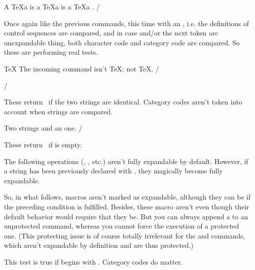 \Example
\def\tex{\TeX\iffcatnext a{ }}
A \tex is a \tex is a \tex.
\Example/

Once again like the previous commands, this time with
an \com\ifx, i.e. the definitions of control sequences
are compared, and in case  and/or the next
token are unexpandable thing, both character code and
category code are compared. So these are performing 
real \com\ifx tests.

\Example
\def\foo{not \string\TeX}
\reverse\iffxnextnospace\TeX
  {The incoming command isn't \string\TeX: } \foo.
\Example/

\description/







These return \true\ if the two strings are identical.
Category codes aren't taken into account when strings
are compared.

\Example
Two  strings
and an \reverse{} one.
\Example/


These return \true\ if  is empty.




The following operations (\com\ifprefix, \com\removesuffix, etc.)
aren't fully expandable by default. However, if a string has been
previously declared with \com\newstring, they magically become
fully expandable.

So, in what follows, macros aren't marked as expandable, although
they can be if the preceding condition is fulfilled. Besides, these
macro aren't \com\protected even though their default behavior would
require that they be. But you can always append a \com\noexpand to
an unprotected command, whereas you cannot force the execution of a
protected one. (This protecting issue is of course totally irrelevant
for the \com\removeprefixin and \com\removesuffixin commands, which aren't
expandable by definition and are thus protected.)




This test is true if  begins with .
Category codes do matter. 

